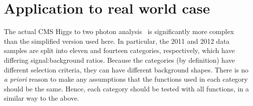
\section{Application to real world case}
\label{sec:discussion}
\label{sec:discussion:higgs}


The actual CMS
Higgs to two photon analysis~\cite{ref:introduction:legacy}
is significantly more
complex than the simplified version used here. In particular, the 2011 
and 2012 data
samples are split into eleven and fourteen categories, respectively, which have
differing signal:background ratios.
Because the categories (by definition) have different selection criteria,
they can have different background shapes.
There is no {\it a priori} reason to make any assumptions that the functions
used in each category should be the same. Hence, each category should be
tested with all functions, in a similar way to the above.

